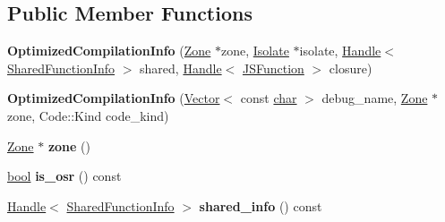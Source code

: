 \subsection*{Public Member Functions}
\begin{DoxyCompactItemize}
\item 
\mbox{\label{classv8_1_1internal_1_1OptimizedCompilationInfo_ac8d544249d80728a235bb4855cbe84af}} 
{\bfseries Optimized\+Compilation\+Info} (\mbox{\hyperlink{classv8_1_1internal_1_1Zone}{Zone}} $\ast$zone, \mbox{\hyperlink{classv8_1_1internal_1_1Isolate}{Isolate}} $\ast$isolate, \mbox{\hyperlink{classv8_1_1internal_1_1Handle}{Handle}}$<$ \mbox{\hyperlink{classv8_1_1internal_1_1SharedFunctionInfo}{Shared\+Function\+Info}} $>$ shared, \mbox{\hyperlink{classv8_1_1internal_1_1Handle}{Handle}}$<$ \mbox{\hyperlink{classv8_1_1internal_1_1JSFunction}{J\+S\+Function}} $>$ closure)
\item 
\mbox{\label{classv8_1_1internal_1_1OptimizedCompilationInfo_afaa68eb89ea5cb55f060c3364b833d11}} 
{\bfseries Optimized\+Compilation\+Info} (\mbox{\hyperlink{classv8_1_1internal_1_1Vector}{Vector}}$<$ const \mbox{\hyperlink{classchar}{char}} $>$ debug\+\_\+name, \mbox{\hyperlink{classv8_1_1internal_1_1Zone}{Zone}} $\ast$zone, Code\+::\+Kind code\+\_\+kind)
\item 
\mbox{\label{classv8_1_1internal_1_1OptimizedCompilationInfo_ae659cb6c5080d4ada23f651840f99d55}} 
\mbox{\hyperlink{classv8_1_1internal_1_1Zone}{Zone}} $\ast$ {\bfseries zone} ()
\item 
\mbox{\label{classv8_1_1internal_1_1OptimizedCompilationInfo_ae71e956dce73532f25963eda69bdeb7b}} 
\mbox{\hyperlink{classbool}{bool}} {\bfseries is\+\_\+osr} () const
\item 
\mbox{\label{classv8_1_1internal_1_1OptimizedCompilationInfo_ac06987fbc386e572cccd6217531a56c1}} 
\mbox{\hyperlink{classv8_1_1internal_1_1Handle}{Handle}}$<$ \mbox{\hyperlink{classv8_1_1internal_1_1SharedFunctionInfo}{Shared\+Function\+Info}} $>$ {\bfseries shared\+\_\+info} () const
\item 
\mbox{\label{classv8_1_1internal_1_1OptimizedCompilationInfo_a9b3bc1305bd331dd34da03c27086bfeb}} 

\end{DoxyCompactItemize}
